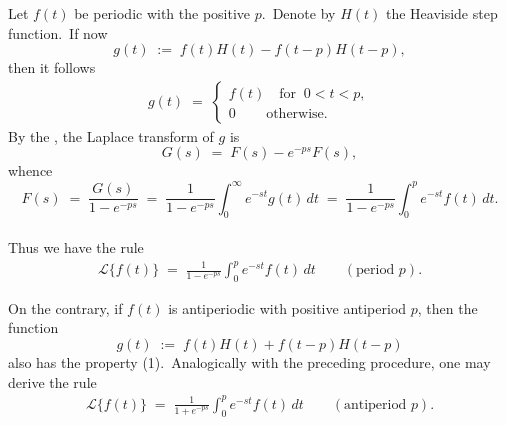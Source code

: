 \documentclass[12pt]{article}
\theoremstyle{definition}
\begin{document}
Let $f(t)$ be periodic with the positive  $p$.\, Denote by $H(t)$ the Heaviside step function.\, If now 
$$g(t) \;:=\; f(t)H(t)\!-\!f(t\!-\!p)H(t\!-\!p),$$
then it follows
\begin{align}
g(t) \;=\; 
\begin{cases}
f(t) \quad \mbox{for}\;\;0 < t < p,\\
0 \qquad\, \mbox{otherwise.}
\end{cases}
\end{align}
By the , the Laplace transform of $g$ is
$$G(s) \;=\; F(s)\!-\!e^{-ps}F(s),$$
whence
$$F(s) \;=\; \frac{G(s)}{1\!-\!e^{-ps}} \;=\; \frac{1}{1\!-\!e^{-ps}}\int_0^\infty\!e^{-st}g(t)\,dt
\;=\; \frac{1}{1\!-\!e^{-ps}}\int_0^p\!e^{-st}f(t)\,dt.$$\\


Thus we have the rule
\begin{align}
\mathcal{L}\{f(t)\} \;=\; \frac{1}{1\!-\!e^{-ps}}\int_0^p\!e^{-st}f(t)\,dt \qquad (\mbox{period } p).
\end{align}


On the contrary, if $f(t)$ is antiperiodic with positive antiperiod $p$, then the function
$$g(t) \;:=\; f(t)H(t)\!+\!f(t\!-\!p)H(t\!-\!p)$$
also has the property (1).\, Analogically with the preceding procedure, one may derive the rule
\begin{align}
\mathcal{L}\{f(t)\} \;=\; \frac{1}{1\!+\!e^{-ps}}\int_0^p\!e^{-st}f(t)\,dt \qquad (\mbox{antiperiod } p).
\end{align}



\end{document}
